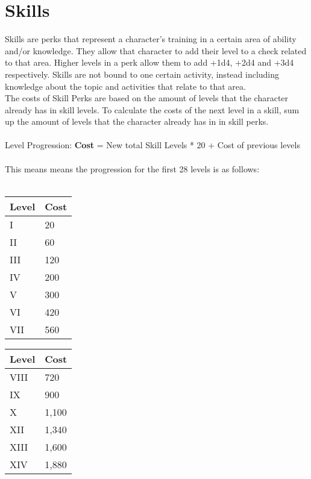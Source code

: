 \chapter{Skills}
Skills are perks that represent a character's training in a certain area of ability and/or knowledge. They allow that character to add their level to a check related to that area. Higher levels in a perk allow them to add +1d4, +2d4 and +3d4 respectively. Skills are not bound to one certain activity, instead including knowledge about the topic and activities that relate to that area.\\
The costs of Skill Perks are based on the amount of levels that the character already has in skill levels. To calculate the costs of the next level in a skill, sum up the amount of levels that the character already has in in skill perks.\\
\\
Level Progression: \textbf{Cost} = New total Skill Levels * 20 + Cost of previous levels\\
\\
This means means the progression for the first 28 levels is as follows:\\
\\
\begin{minipage}{0.25\textwidth}
    \begin{tabular}{l | l}
        Level & Cost\\ \hline
        I & 20\\
        II & 60\\
        III & 120\\
        IV & 200\\
        V & 300\\
        VI & 420\\
        VII & 560\\
    \end{tabular}
\end{minipage}
\begin{minipage}{0.25\textwidth}
    \begin{tabular}{l | l}
        Level & Cost\\ \hline
        VIII & 720\\
        IX & 900\\
        X & 1,100\\
        XII & 1,340\\
        XIII & 1,600\\
        XIV & 1,880\\
    \end{tabular}
\end{minipage}
